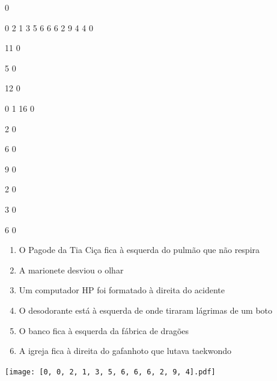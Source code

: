 \documentclass[12pt]{article}
\begin{document}
		\vfill  
		  
{
	0	%

	0	%
	2	%
	1	%
	3	%
	5	%
	6	%
	6	%
	6	%
	2	%
	9	%
	4	%
	4	%
	0	%

	11	%
	0	%

	5	%
	0	%

	12	%
	0	%

	0	%
	1	%
	16	%
	0	%

	2	%
	0	%

	6	%
	0	%

	9	%
	0	%

	2	%
	0	%

	3	%
	0	%

	6	%
	0	%

}	  
		    	

		 

\pagebreak


	\begin{enumerate}
		  \sffamily %
		  \large %


\vfill \item
O Pagode da Tia Ciça fica	%
à esquerda
do pulmão que não respira	%

\vfill \item
A marionete	%
desviou o olhar	%

\vfill \item
Um computador HP foi formatado	%
à direita
do acidente	%

\vfill \item
O desodorante está	%
à esquerda
de onde tiraram lágrimas de um boto	%

\vfill \item
O banco fica	%
à esquerda
da fábrica de dragões	%

\vfill \item
A igreja fica	%
à direita
do gafanhoto que lutava taekwondo	%
	\end{enumerate}
		  
		  \hfill

		  \vfill

\texttt{[image: [0, 0, 2, 1, 3, 5, 6, 6, 6, 2, 9, 4].pdf]}
\end{document}
